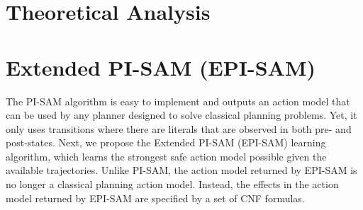 \documentclass[letterpaper]{article} %
\newtheorem{observation}{Observation}
\newcommand{\tuple}[1]{\ensuremath{\left \langle #1 \right \rangle }}
\newcommand{\pre}{\textit{pre}}
\newcommand{\eff}{\textit{eff}}
\begin{document}
\section{Theoretical Analysis}





\section{Extended PI-SAM (EPI-SAM)}


    
    
   
The PI-SAM algorithm is easy to implement and outputs an action model that can be used by any planner designed to solve classical planning problems.
Yet, it only uses transitions where there are literals that are observed in both pre- and post-states. 
Next, we propose the Extended PI-SAM (EPI-SAM) learning algorithm, which learns the strongest safe action model possible given the available trajectories. 
Unlike PI-SAM, the action model returned by EPI-SAM is no longer a classical planning action model. 
Instead, the effects in the action model returned by EPI-SAM are specified by a set of CNF formulas. 
\end{document}
